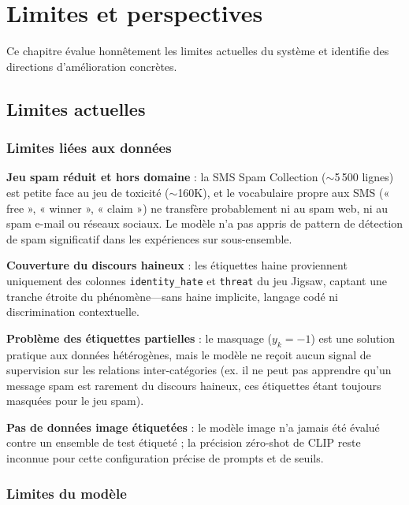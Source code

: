 \chapter{Limites et perspectives}
\label{ch:limitations}

Ce chapitre évalue honnêtement les limites actuelles du système et identifie des directions d'amélioration concrètes.

\section{Limites actuelles}

\subsection{Limites liées aux données}

\textbf{Jeu spam réduit et hors domaine} : la SMS Spam Collection ($\sim$5\,500 lignes) est petite face au jeu de toxicité ($\sim$160K), et le vocabulaire propre aux SMS (« free », « winner », « claim ») ne transfère probablement ni au spam web, ni au spam e-mail ou réseaux sociaux. Le modèle n'a pas appris de pattern de détection de spam significatif dans les expériences sur sous-ensemble.

\textbf{Couverture du discours haineux} : les étiquettes haine proviennent uniquement des colonnes \texttt{identity\_hate} et \texttt{threat} du jeu Jigsaw, captant une tranche étroite du phénomène---sans haine implicite, langage codé ni discrimination contextuelle.

\textbf{Problème des étiquettes partielles} : le masquage ($y_k = -1$) est une solution pratique aux données hétérogènes, mais le modèle ne reçoit aucun signal de supervision sur les relations inter-catégories (ex. il ne peut pas apprendre qu'un message spam est rarement du discours haineux, ces étiquettes étant toujours masquées pour le jeu spam).

\textbf{Pas de données image étiquetées} : le modèle image n'a jamais été évalué contre un ensemble de test étiqueté ; la précision zéro-shot de CLIP reste inconnue pour cette configuration précise de prompts et de seuils.

\subsection{Limites du modèle}

